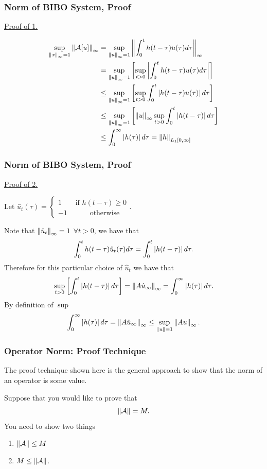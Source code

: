 \documentclass{beamer}
\begin{document}
\begin{frame}\frametitle{Norm of BIBO System, Proof}
	\underline{Proof of 1.}

	\begin{align*}
		\sup_{\left\|x\right\|_{\infty} = 1} \left\|\mathcal{A}[u]\right\|_{\infty} &= \sup_{\left\|u\right\|_{\infty} =
  		1} \left\| \int_0^t h(t - \tau) u(\tau) d\tau  \right\|_{\infty}
		\\
		&= \sup_{\left\|u\right\|_{\infty} = 1} \left[ \sup_{t > 0} \left|
  			\int_0^t h(t-\tau)u(\tau)d\tau\right| \right]\\
		&\leq \sup_{\left\|u\right\|_{\infty} = 1} \left[ \sup_{t > 0}
  			\int_0^t \left| h(t-\tau)u(\tau)\right| d\tau \right]\\
		&\leq \sup_{\left\|u\right\|_{\infty} = 1} \left[ \left\| u \right\|_{\infty} \sup_{t > 0} \int_0^t \left| h(t - \tau)\right| d\tau
			\right]\\
		&\leq \int_0^{\infty} \left|h(\tau)\right|d\tau = \left\|h\right\|_{L_1[0,\infty]}
	\end{align*}
\end{frame}

\begin{frame}\frametitle{Norm of BIBO System, Proof}
	\underline{Proof of 2.}
	
	Let $\hat{u}_t(\tau) = \begin{cases}
			1 & \text{ if } h(t-\tau) \geq 0\\
			-1 & \qquad \text{ otherwise }
			\end{cases}$.

	Note that $\left\|\hat{u}_t\right\|_{\infty} = 1$ $\forall t>0$, we have that
	\[ 
		\int_0^t h(t-\tau)\hat{u}_t(\tau)d\tau = \int_0^t \left|h(t - \tau)\right| d\tau.
	\]
	Therefore for this particular choice of $\hat{u}_t$ we have that
	\[ 
		\sup_{t > 0} \left[ \int_0^t \left|h(t-\tau)\right|d\tau\right] = \left\| A\hat{u}_\infty \right\|_{\infty} = \int_0^{\infty} \left|h(\tau)\right|d\tau.
	\]
	By definition of $\sup$
	\[ 
		\int_0^{\infty} \left|h(\tau)\right|d\tau = \left\| A\hat{u}_\infty \right\|_{\infty} \leq
		\sup_{\left\|u\right\|=1} \left\|Au\right\|_{\infty}.
	\]
\end{frame}

\begin{frame}\frametitle{Operator Norm: Proof Technique}
	The proof technique shown here is the general approach to show that the norm of an operator is some value. 
	
	\vfill 

	Suppose that you would like to prove that
	\[ 
	\left\|\mathcal{A}\right\| = M.
	\]
	You need to show two things
	\begin{enumerate}
		\item $\left\|\mathcal{A}\right\| \leq M$
		\item $M \leq \left\|\mathcal{A}\right\|$.
	\end{enumerate}
\end{frame}
\end{document}
